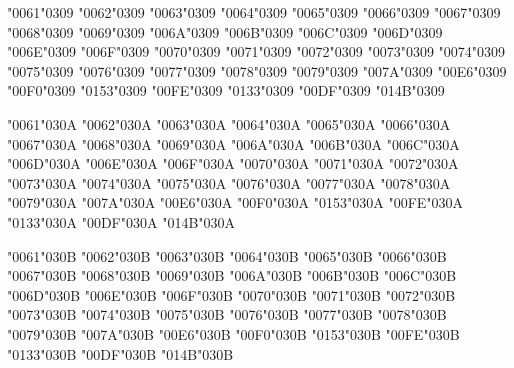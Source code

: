 \textsc{\char"0061\char"0309} \textsc{\char"0062\char"0309} \textsc{\char"0063\char"0309} \textsc{\char"0064\char"0309} \textsc{\char"0065\char"0309} \textsc{\char"0066\char"0309} \textsc{\char"0067\char"0309} \textsc{\char"0068\char"0309} \textsc{\char"0069\char"0309} \textsc{\char"006A\char"0309} \textsc{\char"006B\char"0309} \textsc{\char"006C\char"0309} \textsc{\char"006D\char"0309} \textsc{\char"006E\char"0309} \textsc{\char"006F\char"0309} \textsc{\char"0070\char"0309} \textsc{\char"0071\char"0309} \textsc{\char"0072\char"0309} \textsc{\char"0073\char"0309} \textsc{\char"0074\char"0309} \textsc{\char"0075\char"0309} \textsc{\char"0076\char"0309} \textsc{\char"0077\char"0309} \textsc{\char"0078\char"0309} \textsc{\char"0079\char"0309} \textsc{\char"007A\char"0309} \textsc{\char"00E6\char"0309} \textsc{\char"00F0\char"0309} \textsc{\char"0153\char"0309} \textsc{\char"00FE\char"0309} \textsc{\char"0133\char"0309} \textsc{\char"00DF\char"0309} \textsc{\char"014B\char"0309}

\textsc{\char"0061\char"030A} \textsc{\char"0062\char"030A} \textsc{\char"0063\char"030A} \textsc{\char"0064\char"030A} \textsc{\char"0065\char"030A} \textsc{\char"0066\char"030A} \textsc{\char"0067\char"030A} \textsc{\char"0068\char"030A} \textsc{\char"0069\char"030A} \textsc{\char"006A\char"030A} \textsc{\char"006B\char"030A} \textsc{\char"006C\char"030A} \textsc{\char"006D\char"030A} \textsc{\char"006E\char"030A} \textsc{\char"006F\char"030A} \textsc{\char"0070\char"030A} \textsc{\char"0071\char"030A} \textsc{\char"0072\char"030A} \textsc{\char"0073\char"030A} \textsc{\char"0074\char"030A} \textsc{\char"0075\char"030A} \textsc{\char"0076\char"030A} \textsc{\char"0077\char"030A} \textsc{\char"0078\char"030A} \textsc{\char"0079\char"030A} \textsc{\char"007A\char"030A} \textsc{\char"00E6\char"030A} \textsc{\char"00F0\char"030A} \textsc{\char"0153\char"030A} \textsc{\char"00FE\char"030A} \textsc{\char"0133\char"030A} \textsc{\char"00DF\char"030A} \textsc{\char"014B\char"030A}

\textsc{\char"0061\char"030B} \textsc{\char"0062\char"030B} \textsc{\char"0063\char"030B} \textsc{\char"0064\char"030B} \textsc{\char"0065\char"030B} \textsc{\char"0066\char"030B} \textsc{\char"0067\char"030B} \textsc{\char"0068\char"030B} \textsc{\char"0069\char"030B} \textsc{\char"006A\char"030B} \textsc{\char"006B\char"030B} \textsc{\char"006C\char"030B} \textsc{\char"006D\char"030B} \textsc{\char"006E\char"030B} \textsc{\char"006F\char"030B} \textsc{\char"0070\char"030B} \textsc{\char"0071\char"030B} \textsc{\char"0072\char"030B} \textsc{\char"0073\char"030B} \textsc{\char"0074\char"030B} \textsc{\char"0075\char"030B} \textsc{\char"0076\char"030B} \textsc{\char"0077\char"030B} \textsc{\char"0078\char"030B} \textsc{\char"0079\char"030B} \textsc{\char"007A\char"030B} \textsc{\char"00E6\char"030B} \textsc{\char"00F0\char"030B} \textsc{\char"0153\char"030B} \textsc{\char"00FE\char"030B} \textsc{\char"0133\char"030B} \textsc{\char"00DF\char"030B} \textsc{\char"014B\char"030B}

